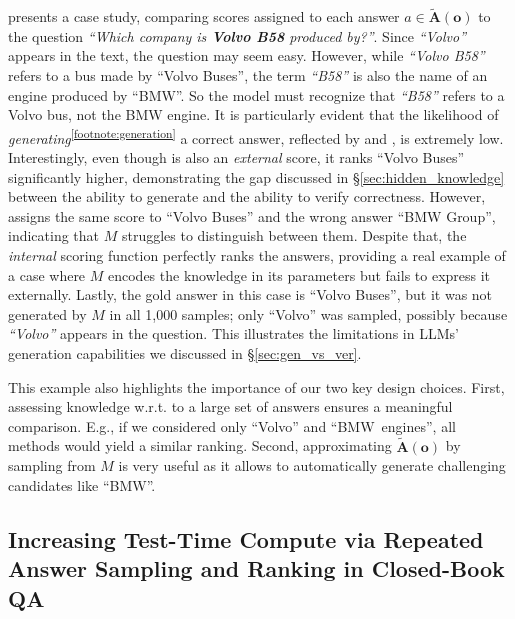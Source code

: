  presents a case study, comparing scores assigned to each answer $a \in \mathbf{\tilde{A}(o)}$ to the question \textit{``Which company is \textbf{Volvo B58} produced by?''}.
Since \textit{``Volvo''} appears in the text, the question may seem easy. However, while \textit{``Volvo B58''} refers to a bus made by ``Volvo Buses'', the term \textit{``B58''} is also the name of an engine produced by ``BMW''. So the model must recognize that \textit{``B58''} refers to a Volvo bus, not the BMW engine. 
It is particularly evident that
the likelihood of \textit{generating}\textsuperscript{\ref{footnote:generation}} a correct answer, reflected by \baselineA and \baselineB, is extremely low. Interestingly, even though \baselineC is also an \textit{external} score, it ranks ``Volvo Buses'' significantly higher, demonstrating the gap discussed in \S \ref{sec:hidden_knowledge} between the ability to generate and the ability to verify correctness. However, \baselineC assigns the same score to ``Volvo Buses'' and the wrong answer ``BMW Group'', indicating that $M$ struggles to distinguish between them. Despite that, the \textit{internal} scoring function perfectly ranks the answers, providing a real example of a case where $M$ encodes the knowledge in its parameters but fails to express it externally. Lastly, the gold answer in this case is ``Volvo Buses'', but it was not generated by $M$ in all 1,000 samples; only ``Volvo'' was sampled, possibly because \textit{``Volvo''} appears in the question. This illustrates the limitations in LLMs' generation capabilities we discussed 
in \S \ref{sec:gen_vs_ver}.

This example also highlights the importance of our two key design choices. First, assessing knowledge w.r.t. to a large set of answers ensures a meaningful comparison. E.g., if we considered only ``Volvo'' and \mbox{``BMW engines''}, all methods would yield a similar ranking. Second, approximating $\mathbf{\tilde{A}(o)}$ by sampling from $M$ is very useful as it allows to automatically generate challenging candidates like ``BMW''.




\vspace{-6pt}
\subsection{Increasing Test-Time Compute via Repeated Answer Sampling and Ranking in Closed-Book QA}
\vspace{-6pt}

